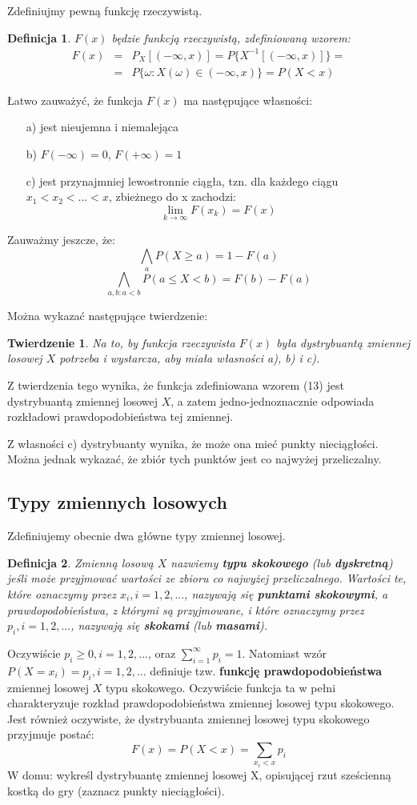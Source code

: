 \documentclass[10pt,a4paper]{article}
\newtheorem{defin}{Definicja}[section]
\newtheorem{twier}{Twierdzenie}[section]
\begin{document}
Zdefiniujmy pewną funkcję rzeczywistą.
\begin{defin}
$F(x)$ będzie funkcją rzeczywistą, zdefiniowaną wzorem:
\begin{eqnarray}
F(x) & = & P_X[(-\infty, x)] = P\{X^{-1}[(-\infty, x)]\} =
\nonumber \\
& = &  P\{\omega: X(\omega)\in(-\infty,x)\} = P(X<x)
\end{eqnarray}
\end{defin}
Łatwo zauważyć, że funkcja $F(x)$ ma następujące własności:
\begin{enumerate}
\item[a)] jest nieujemna i niemalejąca
\item[b)] $F(-\infty) = 0$, $F(+\infty) = 1$
\item[c)] jest przynajmniej lewostronnie ciągła, tzn. dla każdego ciągu \\ $x_1<x_2<...<x$, zbieżnego do x zachodzi:
\[\lim_{k\rightarrow\infty}F(x_k) = F(x)\]
\end{enumerate}
Zauważmy jeszcze, że:
\[\bigwedge_a P(X\geq a) = 1 - F(a)\]
\[\bigwedge_{a,b: a<b} P(a\leq X<b) = F(b) - F(a)\]

Można wykazać następujące twierdzenie:
\begin{twier}
Na to, by funkcja rzeczywista $F(x)$ była dystrybuantą zmiennej losowej $X$ potrzeba i wystarcza, aby miała własności a), b) i c).
\end{twier}
Z twierdzenia tego wynika, że funkcja zdefiniowana wzorem (13) jest dystrybuantą zmiennej losowej $X$, a zatem jedno-jednoznacznie odpowiada rozkładowi
prawdopodobieństwa tej zmiennej.

Z własności c) dystrybuanty wynika, że może ona mieć punkty nieciągłości. Można jednak wykazać, że zbiór tych punktów jest co najwyżej przeliczalny.

\subsection{Typy zmiennych losowych}
Zdefiniujemy obecnie dwa główne typy zmiennej losowej.
\begin{defin}
Zmienną losową $X$ nazwiemy \textbf{typu skokowego} (lub \textbf{dyskretną}) jeśli może przyjmować wartości ze zbioru co najwyżej przeliczalnego. Wartości
te, które oznaczymy przez $x_i, i=1,2,...$, nazywają się \textbf{punktami skokowymi}, a prawdopodobieństwa, z którymi są przyjmowane, i które oznaczymy przez 
$p_i, i=1,2,...$, nazywają się \textbf{skokami} (lub \textbf{masami}). 
\end{defin}
Oczywiście $p_i\geq0, i=1,2,...$, oraz $\sum_{i=1}^{\infty}p_i=1$. Natomiast wzór $P(X=x_i)=p_i,i=1,2,...$ definiuje tzw. \textbf{funkcję prawdopodobieństwa} zmiennej losowej $X$ typu skokowego. Oczywiście funkcja ta w pełni
charakteryzuje rozkład prawdopodobieństwa zmiennej losowej typu skokowego. Jest również oczywiste, że dystrybuanta zmiennej losowej typu skokowego przyjmuje postać:
\begin{equation}
F(x) = P(X<x) = \sum_{x_i<x}p_i
\end{equation}
W domu: wykreśl dystrybuantę zmiennej losowej X, opisującej rzut sześcienną kostką do gry (zaznacz punkty nieciągłości).
\end{document}
